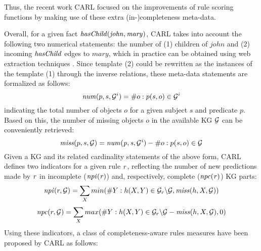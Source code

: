 Thus, the recent work CARL \cite{carl} focused on the improvements of rule scoring functions by making use of these extra (in-)completeness meta-data.

Overall, for a given fact $\mathit{hasChild(john,  mary)}$, CARL takes into account the following two numerical statements: the number of (1) children of $john$ and (2) incoming $\mathit{hasChild}$ edges to $mary$, which in practice can be obtained using web extraction techniques \cite{cardinality-extraction-iswc-2016}. Since template (2) could be rewritten as the instances of the template (1) through the inverse relations, these meta-data statements are formalized as follows:
\[\mathit{num}(p,s, \mathcal{G}^i) = \# o : p(s,o) \in \mathcal{G}^i\]
indicating the total number of objects $o$ for a given subject $s$ and predicate $p$. Based on this, the number of missing objects $o$ in the available KG $\mathcal{G}$ can be conveniently  retrieved:
\[\mathit{miss}(p,s,\mathcal{G}) = \mathit{num(p,s,\mathcal{G}^i)} - \#o : p(s,o) \in \mathcal{G}\]
Given a KG and its related cardinality statements of the above form, CARL defines two indicators for a given rule $\mathit{r}$, reflecting the number of new 
predictions made by $\mathit{r}$ in incomplete ($\mathit{npi(r)}$) and, respectively, complete ($\mathit{npc(r)}$) KG parts:
\begin{align*}
\mathit{npi}(r, \mathcal{G}) = \sum_X min(\#Y: h(X,Y)\in \mathcal{G}_r\backslash \mathcal{G}, \mathit{miss}(h,X,\mathcal{G}))
\end{align*}
\vspace{-\topsep}
\vspace{-\topsep}
\begin{align*}
\mathit{npc}(r, \mathcal{G}) = \sum_X max(\#Y: h(X,Y)\in\mathcal{G}_r\backslash \mathcal{G} - \mathit{miss}(h,X,\mathcal{G}), 0)
\end{align*}
Using these indicators, a class of completeness-aware rules measures have been proposed by CARL as follows:
% 

